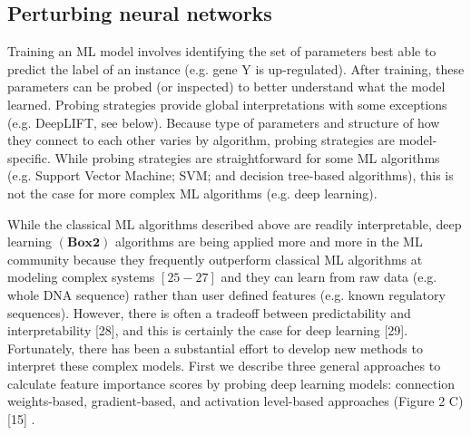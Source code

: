 
\subsection{Perturbing neural networks}
Training an ML model involves identifying the set of parameters best able to predict the label of an instance (e.g. gene Y is up-regulated). After training, these parameters can be probed (or
inspected) to better understand what the model learned. Probing strategies provide global interpretations with some exceptions (e.g. DeepLIFT, see below). Because type of parameters and structure of how they connect to each other varies by algorithm, probing strategies are
model-specific. While probing strategies are straightforward for some ML algorithms (e.g. Support Vector Machine; SVM; and decision tree-based algorithms), this is not the case for more complex ML algorithms (e.g. deep learning).

While the classical ML algorithms described above are readily interpretable, deep
learning $(\mathbf{B} \mathbf{o x} \mathbf{2})$ algorithms are being applied more and more in the ML community because
they frequently outperform classical ML algorithms at modeling complex systems $[25-27]$ and
they can learn from raw data (e.g. whole DNA sequence) rather than user defined features (e.g.
known regulatory sequences). However, there is often a tradeoff between predictability and
interpretability [28], and this is certainly the case for deep learning [29]. Fortunately, there has
been a substantial effort to develop new methods to interpret these complex models. First we
describe three general approaches to calculate feature importance scores by probing deep
learning models: connection weights-based, gradient-based, and activation level-based
approaches (Figure 2 C) [15] .

